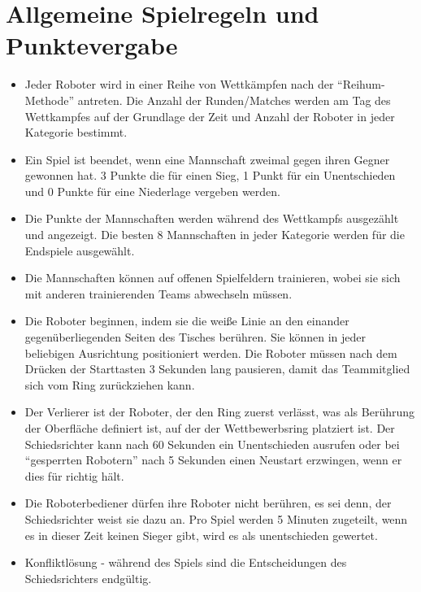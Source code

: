 \documentclass[a4paper,12pt]{article}
\begin{document}
\section{Allgemeine Spielregeln und Punktevergabe}
\begin{itemize}
	\item Jeder Roboter wird in einer Reihe von Wettkämpfen nach der "`Reihum-Methode"' antreten. Die Anzahl der Runden/Matches werden am Tag des Wettkampfes auf der Grundlage der Zeit und Anzahl der Roboter in jeder Kategorie bestimmt.
	\item Ein Spiel ist beendet, wenn eine Mannschaft zweimal gegen ihren Gegner gewonnen hat. 3 Punkte die für einen Sieg, 1 Punkt für ein Unentschieden und 0 Punkte für eine Niederlage vergeben werden.
	\item Die Punkte der Mannschaften werden während des Wettkampfs ausgezählt und angezeigt. Die besten 8 Mannschaften in jeder Kategorie werden für die Endspiele ausgewählt.
	\item Die Mannschaften können auf offenen Spielfeldern trainieren, wobei sie sich mit anderen trainierenden Teams abwechseln müssen.
	\item Die Roboter beginnen, indem sie die weiße Linie an den einander gegenüberliegenden Seiten des Tisches berühren. Sie können in jeder beliebigen Ausrichtung positioniert werden. Die Roboter müssen nach dem Drücken der Starttasten 3 Sekunden lang pausieren, damit das Teammitglied sich vom Ring zurückziehen kann.
	\item Der Verlierer ist der Roboter, der den Ring zuerst verlässt, was als Berührung der Oberfläche definiert ist, auf der der Wettbewerbsring platziert ist. Der Schiedsrichter kann nach 60 Sekunden ein Unentschieden ausrufen oder bei "`gesperrten Robotern"' nach 5 Sekunden einen Neustart erzwingen, wenn er dies für richtig hält.
	\item Die Roboterbediener dürfen ihre Roboter nicht berühren, es sei denn, der Schiedsrichter weist sie dazu an. Pro Spiel werden 5 Minuten zugeteilt, wenn es in dieser Zeit keinen Sieger gibt, wird es als unentschieden gewertet.
	\item Konfliktlösung - während des Spiels sind die Entscheidungen des Schiedsrichters endgültig.
\end{itemize}
\end{document}
